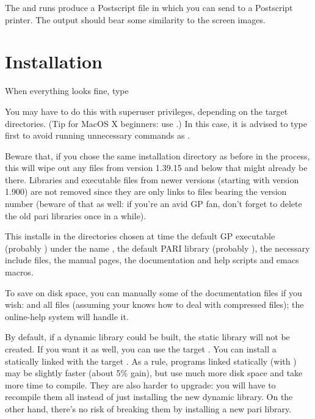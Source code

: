 The  and  runs produce a Postscript
file  in  which you can send to a Postscript
printer. The output should bear some similarity to the screen images.

\section{Installation} When everything looks fine, type


\noindent You may have to do this with superuser privileges, depending on
the target directories. (Tip for MacOS X beginners: use
.) In this case, it is advised to type 
first to avoid running unnecessary commands as .

Beware that, if you chose the same installation directory as before in the
 process, this will wipe out any files from version 1.39.15
and below that might already be there. Libraries and executable files from
newer versions (starting with version 1.900) are not removed since they are
only links to files bearing the version number (beware of that as well: if
you're an avid GP fan, don't forget to delete the old pari libraries once in
a while).

This installs in the directories chosen at  time the default
GP executable (probably ) under the name , the default
PARI library (probably ), the necessary include files, the
manual pages, the documentation and help scripts and emacs macros.

To save on disk space, you can manually  some of the documentation
files if you wish:  and all  files (assuming your
 knows how to deal with compressed files); the online-help system
will handle it.

By default, if a dynamic library  could be built, the static
library  will not be created. If you want it as well, you can
use the target . You can install a statically
linked  with the target . As a rule,
programs linked statically (with ) may be slightly faster
(about 5\% gain), but use much more disk space and take more time to compile.
They are also harder to upgrade: you will have to recompile them all instead
of just installing the new dynamic library. On the other hand, there's no
risk of breaking them by installing a new pari library.

